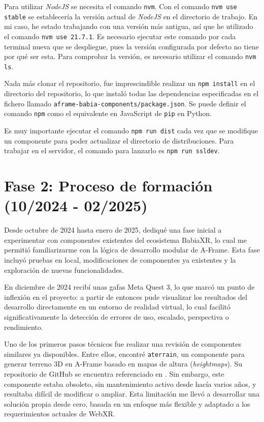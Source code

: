 \documentclass[a4paper, 12pt]{book}
\begin{document}
Para utilizar \textit{NodeJS} se necesita el comando \texttt{nvm}. Con el comando \texttt{nvm use stable} se establecería la versión actual de \textit{NodeJS} en el directorio de trabajo. En mi caso, he estado trabajando con una versión más antigua, así que he utilizado el comando \texttt{nvm use 21.7.1}. Es necesario ejecutar este comando por cada terminal nueva que se despliegue, pues la versión configurada por defecto no tiene por qué ser esta. Para comprobar la versión, es necesario utilizar el comando \texttt{nvm ls}. 

Nada más clonar el repositorio, fue imprescindible realizar un \texttt{npm install} en el directorio del repositorio, lo que instaló todas las dependencias especificadas en el fichero llamado \texttt{aframe-babia-components/package.json}. Se puede definir el comando \texttt{npm} como el equivalente en JavaScript de \texttt{pip} en Python.

Es muy importante ejecutar el comando \texttt{npm run dist} cada vez que se modifique un componente para poder actualizar el directorio de distribuciones. Para trabajar en el servidor, el comando para lanzarlo es \texttt{npm run ssldev}.

\section{Fase 2: Proceso de formación (10/2024 - 02/2025)} 
\label{sec:formacion}

Desde octubre de 2024 hasta enero de 2025, dediqué una fase inicial a experimentar con componentes existentes del ecosistema BabiaXR, lo cual me permitió familiarizarme con la lógica de desarrollo modular de A-Frame. Esta fase incluyó pruebas en local, modificaciones de componentes ya existentes y la exploración de nuevas funcionalidades.

En diciembre de 2024 recibí unas gafas Meta Quest 3, lo que marcó un punto de inflexión en el proyecto: a partir de entonces pude visualizar los resultados del desarrollo directamente en un entorno de realidad virtual, lo cual facilitó significativamente la detección de errores de uso, escalado, perspectiva o rendimiento.

Uno de los primeros pasos técnicos fue realizar una revisión de componentes similares ya disponibles. Entre ellos, encontré \texttt{aterrain}, un componente para generar terreno 3D en A-Frame basado en mapas de altura (\textit{heightmaps}). Su repositorio de GitHub se encuentra referenciado en \cite{joserper-as:_aterrain_component}. Sin embargo, este componente estaba obsoleto, sin mantenimiento activo desde hacía varios años, y resultaba difícil de modificar o ampliar. Esta limitación me llevó a desarrollar una solución propia desde cero, basada en un enfoque más flexible y adaptado a los requerimientos actuales de WebXR.
\end{document}

